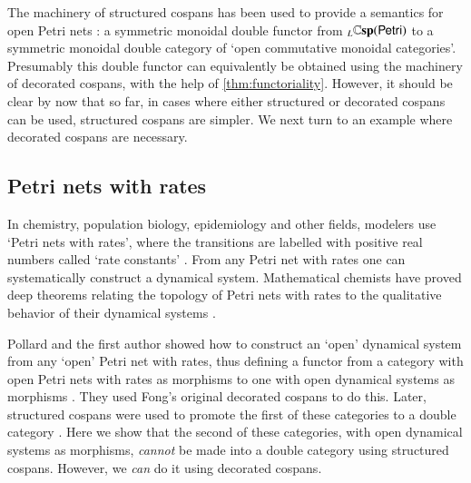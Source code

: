 \documentclass[reqno]{amsart}
\begin{document}
The machinery of structured cospans has been used to provide a semantics for open Petri nets \cite{BM}: a symmetric monoidal double functor from ${}_L \mathbf{\mathbb Csp}(\mathsf{Petri})$ to  a symmetric monoidal double category of `open commutative monoidal categories'.  Presumably this double functor can equivalently be obtained using the machinery of decorated cospans, with the help of \cref{thm:functoriality}.  However, it should be clear by now that so far, in cases where either structured or decorated cospans can be used, structured cospans are simpler.   We next turn to an example where decorated cospans are necessary.

\subsection{Petri nets with rates}
\label{subsec:petrirates}

In chemistry, population biology, epidemiology and other fields, modelers use `Petri nets with rates', where the transitions are labelled with positive real numbers called `rate constants' \cite{Haas,Koch,Wilkinson}.   From any Petri net with rates one can systematically construct a dynamical system.  Mathematical chemists have proved deep theorems relating the topology of Petri nets with rates to the qualitative behavior of their dynamical systems \cite{CTF}.

Pollard and the first author showed how to construct an `open' dynamical system from any `open' Petri net with rates,  thus defining a functor from a category with open Petri nets with rates as morphisms to one with open dynamical systems as morphisms \cite{BP}.  They used Fong's original decorated cospans to do this.   Later, structured cospans were used to promote the first of these categories to a double category \cite[Section 6.16]{BC}. Here we show that the second of these categories, with open dynamical systems as morphisms, \emph{cannot} be made into a double category using structured cospans.  However, we \emph{can} do it using decorated cospans.
 
\end{document}
